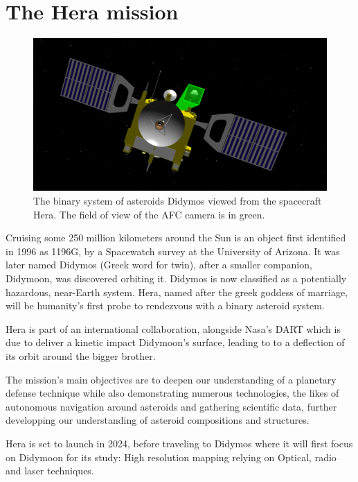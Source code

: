 \section{The Hera mission}
\label{intro}

\begin{figure}[b]
    \centering
    \includegraphics[width=\linewidth]{rsc/hera_didymos.png}
    \caption{The binary system of asteroids Didymos viewed from the spacecraft Hera. The field of view of the AFC camera is in green.}
    \label{fig:1.1}
\end{figure}

Cruising some 250 million kilometers around the Sun is an object first identified in 1996 as 1196G, by a Spacewatch survey at the  University of Arizona. It was later named Didymos (Greek word for twin), after a smaller companion, Didymoon, was discovered orbiting it. Didymos is now classified  as a potentially hazardous, near-Earth system. 
Hera, named after the greek goddess of marriage, will be humanity's first probe to rendezvous with a binary asteroid system. 

Hera is part of an international collaboration, alongside Nasa's DART which is due to deliver a kinetic impact Didymoon's surface, leading to to a deflection of its orbit around the bigger brother.  

The mission's main objectives are to deepen our understanding of a planetary defense technique while also demonstrating numerous technologies, the likes of autonomous navigation around asteroids and gathering scientific data, further developping our understanding of asteroid compositions and structures. 

Hera is set to launch in 2024, before traveling to Didymos where it will first focus on Didymoon for its study: High resolution mapping relying on Optical, radio and laser techniques. 


